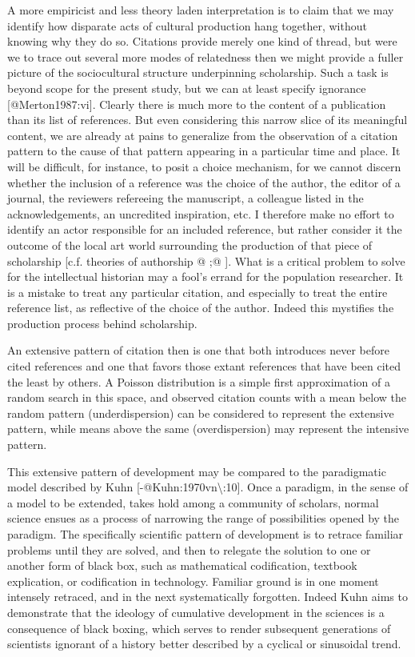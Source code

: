 \documentclass [PhD] {uclathes}
\begin{document}
A more empiricist and less theory laden interpretation is to claim that
we may identify how disparate acts of cultural production hang together,
without knowing why they do so. Citations provide merely one kind of
thread, but were we to trace out several more modes of relatedness then
we might provide a fuller picture of the sociocultural structure
underpinning scholarship. Such a task is beyond scope for the present
study, but we can at least specify ignorance {[}@Merton1987:vi{]}.
Clearly there is much more to the content of a publication than its list
of references. But even considering this narrow slice of its meaningful
content, we are already at pains to generalize from the observation of a
citation pattern to the cause of that pattern appearing in a particular
time and place. It will be difficult, for instance, to posit a choice
mechanism, for we cannot discern whether the inclusion of a reference
was the choice of the author, the editor of a journal, the reviewers
refereeing the manuscript, a colleague listed in the acknowledgements,
an uncredited inspiration, etc. I therefore make no effort to identify
an actor responsible for an included reference, but rather consider it
the outcome of the local art world surrounding the production of that
piece of scholarship {[}c.f. theories of authorship @ ;@ {]}. What is a
critical problem to solve for the intellectual historian may a fool's
errand for the population researcher. It is a mistake to treat any
particular citation, and especially to treat the entire reference list,
as reflective of the choice of the author. Indeed this mystifies the
production process behind scholarship.

An extensive pattern of citation then is one that both introduces never
before cited references and one that favors those extant references that
have been cited the least by others. A Poisson distribution is a simple
first approximation of a random search in this space, and observed
citation counts with a mean below the random pattern (underdispersion)
can be considered to represent the extensive pattern, while means above
the same (overdispersion) may represent the intensive pattern.

This extensive pattern of development may be compared to the
paradigmatic model described by Kuhn
{[}-@Kuhn:1970vn\textbackslash{}:10{]}. Once a paradigm, in the sense of
a model to be extended, takes hold among a community of scholars, normal
science ensues as a process of narrowing the range of possibilities
opened by the paradigm. The specifically scientific pattern of
development is to retrace familiar problems until they are solved, and
then to relegate the solution to one or another form of black box, such
as mathematical codification, textbook explication, or codification in
technology. Familiar ground is in one moment intensely retraced, and in
the next systematically forgotten. Indeed Kuhn aims to demonstrate that
the ideology of cumulative development in the sciences is a consequence
of black boxing, which serves to render subsequent generations of
scientists ignorant of a history better described by a cyclical or
sinusoidal trend.
\end{document}

